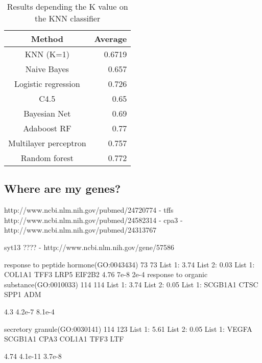 \documentclass[conference,a4paper]{IEEEtran}
\begin{document}
\begin{table}[h]
	\caption{Results depending the K value on the KNN classifier}
	\centering
	\begin{tabular}{c r}
		\hline\hline
		Method & Average\\ [0.2ex]
		\hline
		KNN (K=1) & 0.6719\\
		Naive Bayes & 0.657\\
		Logistic regression & 0.726\\ 
		C4.5 & 0.65\\
		Bayesian Net & 0.69\\
		Adaboost RF & 0.77\\
		Multilayer perceptron & 0.757\\
		Random forest & 0.772\\ [1ex]
		\hline
	\end{tabular}
	\label{table:OverallMethods}
\end{table}

\subsection{Where are my genes?}

http://www.ncbi.nlm.nih.gov/pubmed/24720774 - tffs
http://www.ncbi.nlm.nih.gov/pubmed/24582314 - cpa3 - http://www.ncbi.nlm.nih.gov/pubmed/24313767

syt13 ????  - http://www.ncbi.nlm.nih.gov/gene/57586

response to peptide hormone(GO:0043434)	73	73	List 1: 3.74%
List 2: 0.03%
List 1:
COL1A1
TFF3
LRP5
EIF2B2
4.76	7e-8	2e-4
response to organic substance(GO:0010033)	114	114	List 1: 3.74%
List 2: 0.05%
List 1:
SCGB1A1
CTSC
SPP1
ADM

4.3	4.2e-7	8.1e-4


secretory granule(GO:0030141)	114	123	List 1: 5.61%
List 2: 0.05%
List 1:
VEGFA
SCGB1A1
CPA3
COL1A1
TFF3
LTF

4.74	4.1e-11	3.7e-8


\end{document}
